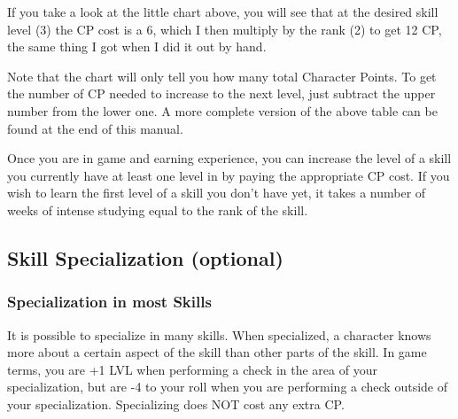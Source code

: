 \documentclass[twoside]{book}
\begin{document}
  
    {  
    If you take a look at the little chart above, you will see that at the desired skill level (3) the CP cost is a 6, which I then multiply by the rank (2) to get 12 CP, the same thing I got when I did it out by hand.
    }
  
    {  
    Note that the chart will only tell you how many total Character Points. To get the number of CP needed to increase to the next level, just subtract the upper number from the lower one. A more complete version of the above table can be found at the end of this manual.
    }
  
    {  
    Once you are in game and earning experience, you can increase the level of a skill you currently have at least one level in by paying the appropriate CP cost. If you wish to learn the first level of a skill you don't have yet, it takes a number of weeks of intense studying equal to the rank of the skill.
    }
  
    

\subsection{Skill Specialization (optional)}
    
    

\subsubsection{Specialization in most Skills}
    
    {  
    It is possible to specialize in many skills. When specialized, a character knows more about a certain aspect of the skill than other parts of the skill. In game terms, you are +1 LVL when performing a check in the area of your specialization, but are -4 to your roll when you are performing a check outside of your specialization. Specializing does NOT cost any extra CP.
    }
  
  

  
\end{document}
